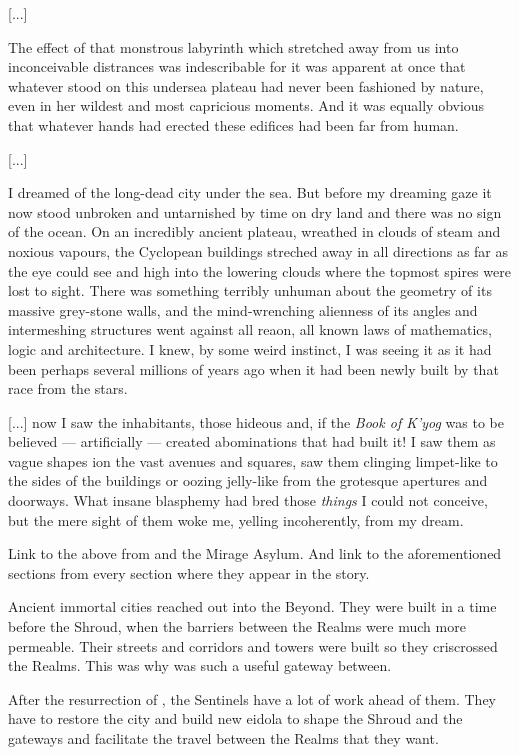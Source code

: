   [...]
  
  The effect of that monstrous labyrinth which stretched away from us into inconceivable distrances was indescribable for it was apparent at once that whatever stood on this undersea plateau had never been fashioned by nature, even in her wildest and most capricious moments. 
  And it was equally obvious that whatever hands had erected these edifices had been far from human. 
  
  [...]
  
  I dreamed of the long-dead city under the sea.
  But before my dreaming gaze it now stood unbroken and untarnished by time on dry land and there was no sign of the ocean.
  On an incredibly ancient plateau, wreathed in clouds of steam and noxious vapours, the Cyclopean buildings streched away in all directions as far as the eye could see and high into the lowering clouds where the topmost spires were lost to sight.
  There was something terribly unhuman about the geometry of its massive grey-stone walls, and the mind-wrenching alienness of its angles and intermeshing structures went against all reaon, all known laws of mathematics, logic and architecture.
  I knew, by some weird instinct, I was seeing it as it had been perhaps several millions of years ago when it had been newly built by that race from the stars. 
  
  [...] now I saw the inhabitants, those hideous and, if the \emph{Book of K'yog} was to be believed --- artificially --- created abominations that had built it!
  I saw them as vague shapes ion the vast avenues and squares, saw them clinging limpet-like to the sides of the buildings or oozing jelly-like from the grotesque apertures and doorways.
  What insane blasphemy had bred those \emph{things} I could not conceive, but the mere sight of them woke me, yelling incoherently, from my dream. 

Link to the above from \Nithdornazsh and the Mirage Asylum. 
And link to the aforementioned sections from every section where they appear in the story. 

Ancient immortal cities reached out into the Beyond. 
They were built in a time before the Shroud, when the barriers between the Realms were much more permeable. 
Their streets and corridors and towers were built so they criscrossed the Realms. 
This was why \Nithdornazsh was such a useful gateway between. 

After the resurrection of \Nithdornazsh, the Sentinels have a lot of work ahead of them.
They have to restore the city and build new eidola to shape the Shroud and the gateways and facilitate the travel between the Realms that they want. 


